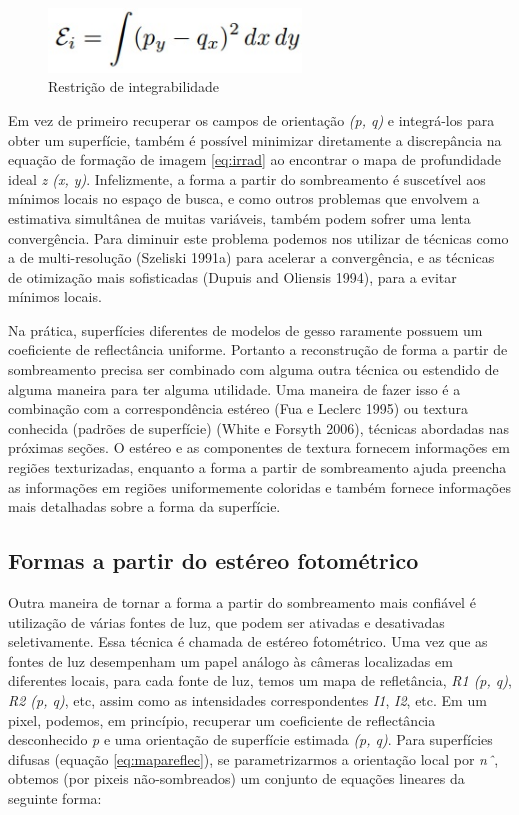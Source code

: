 \documentclass{article}
\begin{document}
\begin{figure}[!htb]
    \centering
    \includegraphics[width=0.60\textwidth]{equacao4.jpg}
    \caption{Restrição de integrabilidade}
    \label{eq:integrabilidade}
\end{figure}

Em vez de primeiro recuperar os campos de orientação \textit{(p, q)} e integrá-los para obter um
superfície, também é possível minimizar diretamente a discrepância na equação de formação de imagem
\ref{eq:irrad} ao encontrar o mapa de profundidade ideal \textit{z (x, y)}. Infelizmente, a forma
a partir do sombreamento é suscetível aos mínimos locais no espaço de busca, e como outros
problemas que envolvem a estimativa simultânea de muitas variáveis, também podem sofrer uma lenta convergência. Para diminuir este problema podemos nos utilizar de técnicas como a de multi-resolução (Szeliski 1991a) para acelerar a convergência, e as técnicas de otimização mais sofisticadas (Dupuis and Oliensis 1994), para a evitar mínimos locais.

Na prática, superfícies diferentes de modelos de gesso raramente possuem um coeficiente de reflectância uniforme. Portanto a reconstrução de forma a partir de sombreamento precisa ser combinado com alguma outra técnica ou estendido de alguma maneira para ter alguma utilidade. Uma maneira de fazer isso é a combinação com a correspondência estéreo (Fua e Leclerc 1995) ou textura conhecida (padrões de superfície) (White e Forsyth 2006), técnicas abordadas nas próximas seções. O estéreo e as componentes de textura fornecem informações em regiões texturizadas, enquanto a forma a partir de sombreamento ajuda preencha as informações em regiões uniformemente coloridas e também fornece informações mais detalhadas sobre a forma da superfície.

\subsection{Formas a partir do estéreo fotométrico}


Outra maneira de tornar a forma a partir do sombreamento mais confiável é utilização de várias
fontes de luz, que podem ser ativadas e desativadas seletivamente. Essa técnica é chamada de estéreo fotométrico. Uma vez que as fontes de luz desempenham um papel análogo às câmeras localizadas em diferentes locais, para cada fonte de luz, temos um mapa de refletância, \textit{R1 (p, q)}, \textit{R2 (p, q)}, etc, assim como as intensidades correspondentes \textit{I1}, \textit{I2}, etc. Em um pixel, podemos, em princípio, recuperar um coeficiente de reflectância desconhecido \textit{p} e uma orientação de superfície estimada \textit{(p, q)}. Para superfícies difusas (equação \ref{eq:mapareflec}), se parametrizarmos a orientação local por  \textit{nˆ}, obtemos (por pixeis não-sombreados) um conjunto de equações lineares da seguinte forma:
\end{document}
